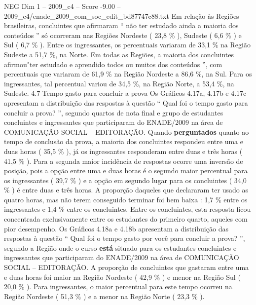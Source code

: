 \begin{textsample}{NEG Dim 1 – 2009\_c4 – Score -9.00 – 2009\_c4/enade\_2009\_com\_soc\_edit\_bd87747c88.txt}
Em relação às Regiões brasileiras, concluintes que afirmaram “ não ter estudado ainda a maioria dos conteúdos ” só ocorreram nas Regiões Nordeste ( 23,8 \% ), Sudeste ( 6,6 \% ) e Sul ( 6,7 \% ).
Entre os ingressantes, os percentuais variaram de 33,1 \% na Região Sudeste a 51,7 \%, na Norte.
Em todas as Regiões, a maioria dos concluintes afirmou"ter estudado e aprendido todos ou muitos dos conteúdos ”, com percentuais que variaram de 61,9 \% na Região Nordeste a 86,6 \%, na Sul.
Para os ingressantes, tal percentual variou de 34,5 \%, na Região Norte, a 53,4 \%, na Sudeste. 4.7 Tempo gasto para concluir a prova Os Gráficos 4.17a, 4.17b e 4.17c apresentam a distribuição das respostas à questão “ Qual foi o tempo gasto para concluir a prova? ”, segundo quartos de nota final e grupo de estudantes concluintes e ingressantes que participaram do ENADE/2009 na área de COMUNICAÇÃO SOCIAL – EDITORAÇÃO.
Quando \textbf{perguntados} quanto ao tempo de conclusão da prova, a maioria dos concluintes respondeu entre uma e duas horas ( 35,5 \% ), já os ingressantes responderam entre duas e três horas ( 41,5 \% ).
Para a segunda maior incidência de respostas ocorre uma inversão de posição, pois a opção entre uma e duas horas é o segundo maior percentual para os ingressantes ( 39,7 \% ) e a opção em segundo lugar para os concluintes ( 34,0 \% ) é entre duas e três horas.
A proporção daqueles que declararam ter usado as quatro horas, mas não terem conseguido terminar foi bem baixa : 1,7 \% entre os ingressantes e 1,4 \% entre os concluintes.
Entre os concluintes, esta resposta ficou concentrada exclusivamente entre os estudantes do primeiro quarto, aqueles com pior desempenho.
Os Gráficos 4.18a e 4.18b apresentam a distribuição das respostas à questão “ Qual foi o tempo gasto por você para concluir a prova? ”, segundo a Região onde o curso \textbf{está} situado para os estudantes concluintes e ingressantes que participaram do ENADE/2009 na área de COMUNICAÇÃO SOCIAL – EDITORAÇÃO.
A proporção de concluintes que gastaram entre uma e duas horas foi maior na Região Nordeste ( 42,9 \% ) e menor na Região Sul ( 20,0 \% ).
Para ingressantes, o maior percentual para este tempo ocorreu na Região Nordeste ( 51,3 \% ) e a menor na Região Norte ( 23,3 \% ).

\end{textsample}
